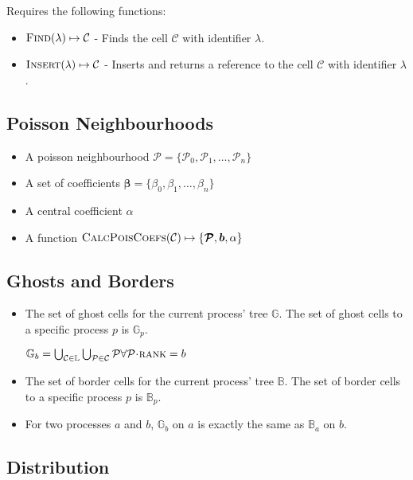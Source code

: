 \documentclass{IIBproject}
\newcommand{\vect}[1]{\bm{#1}}
\newcommand{\acc}{{\mkern 0.5mu\cdot\mkern 0.5mu}}
\begin{document}
Requires the following functions:
\begin{itemize}
	\item $\textproc{Find}(\lambda) \mapsto \mathcal{C}$ - Finds the cell $\mathcal{C}$ with identifier $\lambda$.
	\item $\textproc{Insert}(\lambda) \mapsto \mathcal{C}$ - Inserts and returns a reference to the cell $\mathcal{C}$ with identifier $\lambda$.
\end{itemize}


\subsection{Poisson Neighbourhoods}

\begin{itemize}
	\item A poisson neighbourhood $\vect{\mathcal{P}} = \{\mathcal{P}_0 , \mathcal{P}_1, \dots , \mathcal{P}_n\}$
	\item A set of coefficients $\vect{\beta} = \{\beta_0, \beta_1,\dots,\beta_n\}$
	\item A central coefficient $\alpha$
	\item A function $\textproc{CalcPoisCoefs}(\mathcal{C}) \mapsto \{ \vect{\mathcal{P}}, \vect{b}, \alpha \}$
\end{itemize}


\subsection{Ghosts and Borders}
\label{sec:ghostsandborders}

\begin{itemize}
	\item The set of ghost cells for the current process' tree $\mathbb{G}$. The set of ghost cells to a specific process $p$ is $\mathbb{G}_p$. 

	$\mathbb{G}_b = \bigcup_{\mathcal{C}\in\mathbb{L}} \bigcup_{\mathcal{P}\in\mathcal{C}} \mathcal{P} \forall \mathcal{P}\acc\textproc{rank} = b$
	\item The set of border cells for the current process' tree $\mathbb{B}$. The set of border cells to a specific process $p$ is $\mathbb{B}_p$.
	\item For two processes $a$ and $b$, $\mathbb{G}_b$ on $a$ is exactly the same as $\mathbb{B}_a$ on $b$.
\end{itemize}


\subsection{Distribution}
\end{document}
